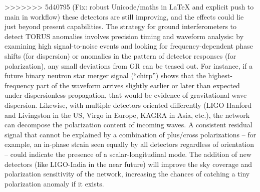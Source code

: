 \documentclass[]{article}
\begin{document}
>>>>>>> 5d40795 (Fix: robust Unicode/maths in LaTeX and explicit push to main in workflow)
these detectors are still improving, and the effects could lie just
beyond present capabilities​. The strategy for ground interferometers to
detect TORUS anomalies involves precision timing and waveform analysis:
by examining high signal-to-noise events and looking for
frequency-dependent phase shifts (for dispersion) or anomalies in the
pattern of detector responses (for polarization), any small deviations
from GR can be teased out. For instance, if a future binary neutron star
merger signal (``chirp'') shows that the highest-frequency part of the
waveform arrives slightly earlier or later than expected under
dispersionless propagation, that would be evidence of gravitational wave
dispersion. Likewise, with multiple detectors oriented differently (LIGO
Hanford and Livingston in the US, Virgo in Europe, KAGRA in Asia, etc.),
the network can decompose the polarization content of incoming waves. A
consistent residual signal that cannot be explained by a combination of
plus/cross polarizations -- for example, an in-phase strain seen equally
by all detectors regardless of orientation -- could indicate the
presence of a scalar-longitudinal mode. The addition of new detectors
(like LIGO-India in the near future) will improve the sky coverage and
polarization sensitivity of the network, increasing the chances of
catching a tiny polarization anomaly if it exists​.
\end{document}
